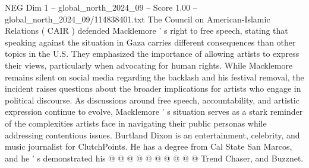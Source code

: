 \begin{textsample}{NEG Dim 1 – global\_north\_2024\_09 – Score 1.00 – global\_north\_2024\_09/114838401.txt}
The Council on American-Islamic Relations ( CAIR ) defended Macklemore ' s right to free speech, stating that speaking against the situation in Gaza carries different consequences than other topics in the U.S.
They emphasized the importance of allowing artists to express their views, particularly when advocating for human rights.
While Macklemore remains silent on social media regarding the backlash and his festival removal, the incident raises questions about the broader implications for artists who engage in political discourse.
As discussions around free speech, accountability, and artistic expression continue to evolve, Macklemore ' s situation serves as a stark reminder of the complexities artists face in navigating their public personas while addressing contentious issues.
Burtland Dixon is an entertainment, celebrity, and music journalist for ClutchPoints.
He has a degree from Cal State San Marcos, and he ' s demonstrated his @ @ @ @ @ @ @ @ @ @ Trend Chaser, and Buzznet.

\end{textsample}
